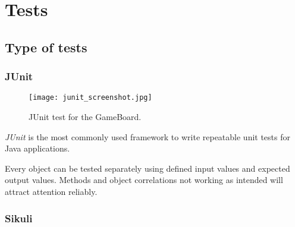 \section{Tests}

\subsection{Type of tests}

\subsubsection{JUnit}

\begin{figure}[h]
	\centering
	\texttt{[image: junit\_screenshot.jpg]}
	\caption{JUnit test for the GameBoard.}
	\label{img:screenJUnit}
\end{figure}
\emph{JUnit} is the most commonly used framework to write repeatable unit tests for Java applications.\par
Every object can be tested separately using defined input values and expected output values. Methods and object correlations not working as intended will attract attention reliably.\par

\subsubsection{Sikuli}

